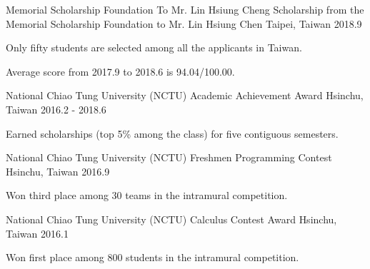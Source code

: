 
\begin{cventries}

  \cventry
    {Memorial Scholarship Foundation To Mr. Lin Hsiung Cheng} %
    {Scholarship from the Memorial Scholarship Foundation to Mr. Lin Hsiung Chen} %
    {Taipei, Taiwan} %
    {2018.9} %
    {
      \begin{cvitems} %
        \item {Only fifty students are selected among all the applicants in Taiwan.}
        \item {Average score from 2017.9 to 2018.6 is 94.04/100.00.}
      \end{cvitems}
    }
  
  \cventry
    {National Chiao Tung University (NCTU)} %
    {Academic Achievement Award} %
    {Hsinchu, Taiwan} %
    {2016.2 - 2018.6} %
    {
      \begin{cvitems} %
        \item {Earned scholarships (top 5\% among the class) for five contiguous semesters.}
      \end{cvitems}
    }  
    
  \cventry
    {National Chiao Tung University (NCTU)} %
    {Freshmen Programming Contest} %
    {Hsinchu, Taiwan} %
    {2016.9} %
    {
      \begin{cvitems} %
        \item {Won third place among 30 teams in the intramural competition.}
      \end{cvitems}
    }
    
  \cventry
    {National Chiao Tung University (NCTU)} %
    {Calculus Contest Award} %
    {Hsinchu, Taiwan} %
    {2016.1} %
    {
      \begin{cvitems} %
        \item {Won first place among 800 students in the intramural competition.}
      \end{cvitems}
    }

\end{cventries}
